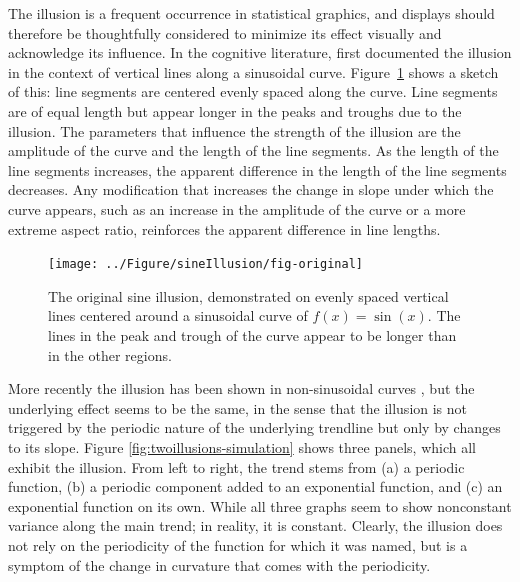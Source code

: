 \documentclass[11pt]{isuthesis}\usepackage[]{graphicx}\usepackage[]{color}
\newenvironment{knitrout}{}{} %
\begin{document}
The illusion is a frequent occurrence in statistical graphics, and  displays should therefore be thoughtfully considered to minimize its effect visually and acknowledge its influence. 
In the cognitive literature, \citet{day:1991} first documented the illusion in the context of vertical lines along a sinusoidal curve. Figure~\ref{fig:original} shows a sketch of this: line segments are centered evenly spaced along the curve. Line segments are of equal length but appear longer in the peaks and troughs due to the illusion. The parameters that influence the strength of the illusion are the amplitude of the curve and the length of the line segments. As the length of the line segments increases,  the apparent difference in the length of the line segments decreases. Any modification that increases the change in slope under which the curve appears, such as an increase in the amplitude of the curve or a more extreme aspect ratio, reinforces the apparent difference in line lengths. 





\begin{figure}[hbtp]
\centering
\begin{knitrout}
\color{fgcolor}

{\centering \texttt{[image: ../Figure/sineIllusion/fig-original]} 

}



\end{knitrout}
\caption[The original sine illusion]{The original sine illusion, demonstrated on evenly spaced vertical lines centered around a sinusoidal curve of $f(x) = \sin(x)$. The lines in the peak and trough of the curve appear to be longer than in the other regions.\label{fig:original}}
\end{figure}

More recently the illusion has been shown in non-sinusoidal curves \citep{cleveland:1984, schonlau:2003, robbins:2005, marie:2013}, but the underlying effect seems to be the same, in the sense that the illusion is not triggered by the periodic nature of the underlying trendline but only by  changes to its slope. Figure \ref{fig:twoillusions-simulation} shows three panels, which all exhibit the illusion. From left to right, the trend stems from (a) a periodic function, (b) a periodic component added to an exponential function, and (c) an exponential function on its own.
While all three graphs seem to show nonconstant variance along the main trend; in reality, it is constant. Clearly, the illusion does not rely on the periodicity of the function for which it was named, but is a symptom of the change in curvature that comes with the periodicity.
\end{document}
